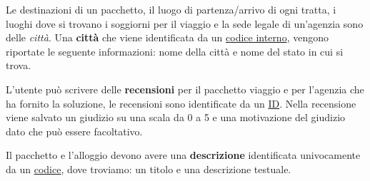 %
%
Le destinazioni di un pacchetto, il luogo di partenza/arrivo di ogni tratta, i luoghi dove si trovano i soggiorni per il viaggio e la sede legale di un'agenzia sono delle \emph{città}. Una \textbf{città} che viene identificata da un \underline{codice interno}, vengono riportate le seguente informazioni: nome della città e nome del stato in cui si trova.

%
%
L'utente può scrivere delle \textbf{recensioni} per il pacchetto viaggio e per l'agenzia che ha fornito la soluzione, le recensioni sono identificate da un \underline{ID}. Nella recensione viene salvato un giudizio su una scala da 0 a 5 e una motivazione del giudizio dato che può essere facoltativo.

%
%
Il pacchetto e l'alloggio devono avere una \textbf{descrizione} identificata univocamente da un \underline{codice}, dove troviamo: un titolo e una descrizione testuale.
%

